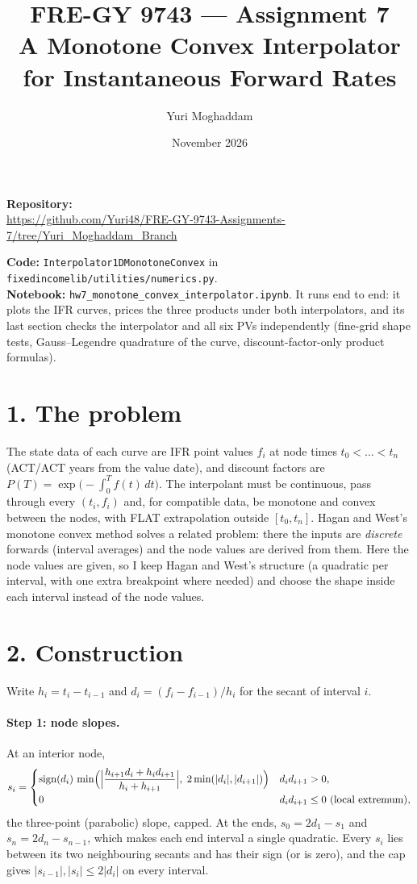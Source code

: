 \documentclass[11pt]{article}
\title{FRE-GY 9743 --- Assignment 7\\ \large A Monotone Convex Interpolator for Instantaneous Forward Rates}
\author{Yuri Moghaddam}
\date{November 2026}
\begin{document}
\maketitle

\noindent\textbf{Repository:}\\
{\small\url{https://github.com/Yuri48/FRE-GY-9743-Assignments-7/tree/Yuri_Moghaddam_Branch}}

\noindent\textbf{Code:} \texttt{Interpolator1DMonotoneConvex} in \texttt{fixedincomelib/utilities/numerics.py}.\\
\textbf{Notebook:} \texttt{hw7\_monotone\_convex\_interpolator.ipynb}. It runs end to end: it plots the IFR curves, prices the three products under both interpolators, and its last section checks the interpolator and all six PVs independently (fine-grid shape tests, Gauss--Legendre quadrature of the curve, discount-factor-only product formulas).

\section*{1. The problem}

The state data of each curve are IFR point values $f_i$ at node times $t_0<\dots<t_n$ (ACT/ACT years from the value date), and discount factors are $P(T)=\exp\bigl(-\int_0^T f(t)\,dt\bigr)$. The interpolant must be continuous, pass through every $(t_i,f_i)$ and, for compatible data, be monotone and convex between the nodes, with FLAT extrapolation outside $[t_0,t_n]$. Hagan and West's monotone convex method solves a related problem: there the inputs are \emph{discrete} forwards (interval averages) and the node values are derived from them. Here the node values are given, so I keep Hagan and West's structure (a quadratic per interval, with one extra breakpoint where needed) and choose the shape inside each interval instead of the node values.

\section*{2. Construction}

Write $h_i=t_i-t_{i-1}$ and $d_i=(f_i-f_{i-1})/h_i$ for the secant of interval $i$.

\paragraph{Step 1: node slopes.} At an interior node,
\[
s_i=\begin{cases}
\operatorname{sign}(d_i)\,\min\Bigl(\Bigl|\dfrac{h_{i+1}d_i+h_i d_{i+1}}{h_i+h_{i+1}}\Bigr|,\;2\min(|d_i|,|d_{i+1}|)\Bigr) & d_i d_{i+1}>0,\\[2mm]
0 & d_i d_{i+1}\le 0 \ \text{(local extremum)},
\end{cases}
\]
the three-point (parabolic) slope, capped. At the ends, $s_0=2d_1-s_1$ and $s_n=2d_n-s_{n-1}$, which makes each end interval a single quadratic. Every $s_i$ lies between its two neighbouring secants and has their sign (or is zero), and the cap gives $|s_{i-1}|,|s_i|\le 2|d_i|$ on every interval.
\end{document}
